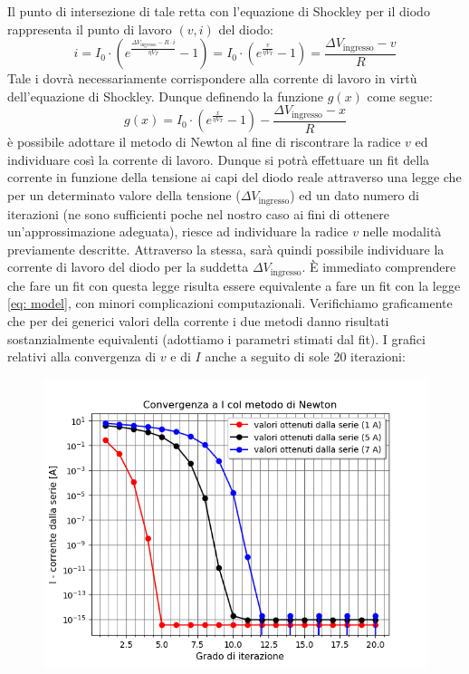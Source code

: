 \documentclass{article}[a4paper, oneside, 11pt]
\begin{document}
Il punto di intersezione di tale retta con l’equazione di Shockley per il 
diodo rappresenta il punto di lavoro $(v, i)$ del diodo:
\begin{equation}
i = I_0 \cdot ( e^{\frac {\Delta V_{\text{ingresso}} - R \cdot i}{\eta V_T} } - 
1) = I_0 \cdot (e^{\frac{v} {\eta V_T}} -1) =  \frac{\Delta V_{\text{ingresso}} 
- v}{R}
\end{equation}
Tale i dovrà necessariamente corrispondere alla corrente di lavoro in virtù 
dell’equazione di Shockley. Dunque definendo la funzione $g(x)$ come segue:
\begin{equation}\label{eq: invsck}
g(x) = I_0 \cdot ( e^{\frac{x}{\eta V_T}} - 1)  - \frac {\Delta 
V_{\text{ingresso}} - x}{R}
\end{equation}
è possibile adottare il metodo di Newton al fine di riscontrare la radice $v$
ed individuare così la corrente di lavoro. 
Dunque si potrà effettuare un fit della corrente in funzione della tensione ai 
capi del diodo reale attraverso una legge che per un determinato valore della 
tensione ($\Delta V_{\text{ingresso}}$) ed un dato numero di iterazioni (ne 
sono sufficienti poche nel nostro caso ai fini di ottenere un’approssimazione 
adeguata), riesce ad individuare la radice $v$ nelle modalità previamente 
descritte. Attraverso la stessa, sarà quindi possibile individuare la corrente 
di lavoro del diodo per la suddetta $\Delta V_{\text{ingresso}}$. 
\`E immediato comprendere che fare un fit con questa legge risulta essere 
equivalente a fare un fit con la legge \eqref{eq: model}, con minori complicazioni 
computazionali. Verifichiamo graficamente che per dei generici valori della 
corrente  i due metodi danno risultati sostanzialmente equivalenti (adottiamo i 
parametri stimati dal fit). I grafici relativi alla convergenza di $v$ e di $I$ 
anche a seguito di sole 20 iterazioni:
\begin{figure}[H]
	\centering 
 		\includegraphics[scale=0.75]{./Figura2_appendiceB.png}
\end{figure}
\end{document}
